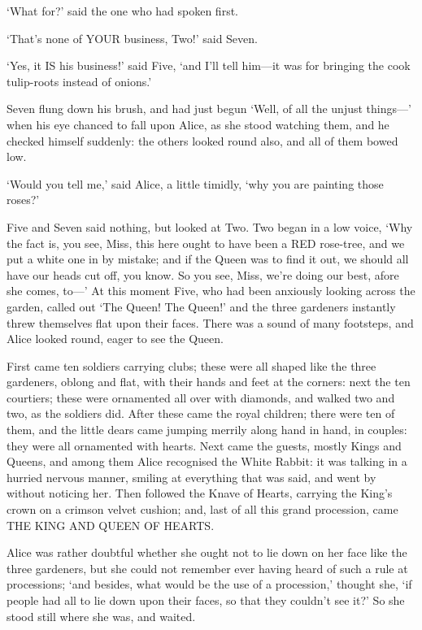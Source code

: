 \documentclass[12pt]{book}
\begin{document}
\begin{Parallel}[p]{}{}
{‘What for?’ said the one who had spoken first.

‘That’s none of YOUR business, Two!’ said Seven.

‘Yes, it IS his business!’ said Five, ‘and I’ll tell him—it was for bringing the cook tulip-roots instead of onions.’

Seven flung down his brush, and had just begun ‘Well, of all the unjust things—’ when his eye chanced to fall upon Alice, as she stood watching them, and he checked himself suddenly: the others looked round also, and all of them bowed low.

‘Would you tell me,’ said Alice, a little timidly, ‘why you are painting those roses?’

Five and Seven said nothing, but looked at Two. Two began in a low voice, ‘Why the fact is, you see, Miss, this here ought to have been a RED rose-tree, and we put a white one in by mistake; and if the Queen was to find it out, we should all have our heads cut off, you know. So you see, Miss, we’re doing our best, afore she comes, to—’ At this moment Five, who had been anxiously looking across the garden, called out ‘The Queen! The Queen!’ and the three gardeners instantly threw themselves flat upon their faces. There was a sound of many footsteps, and Alice looked round, eager to see the Queen.

First came ten soldiers carrying clubs; these were all shaped like the three gardeners, oblong and flat, with their hands and feet at the corners: next the ten courtiers; these were ornamented all over with diamonds, and walked two and two, as the soldiers did. After these came the royal children; there were ten of them, and the little dears came jumping merrily along hand in hand, in couples: they were all ornamented with hearts. Next came the guests, mostly Kings and Queens, and among them Alice recognised the White Rabbit: it was talking in a hurried nervous manner, smiling at everything that was said, and went by without noticing her. Then followed the Knave of Hearts, carrying the King’s crown on a crimson velvet cushion; and, last of all this grand procession, came THE KING AND QUEEN OF HEARTS.

Alice was rather doubtful whether she ought not to lie down on her face like the three gardeners, but she could not remember ever having heard of such a rule at processions; ‘and besides, what would be the use of a procession,’ thought she, ‘if people had all to lie down upon their faces, so that they couldn’t see it?’ So she stood still where she was, and waited.

}
\end{Parallel}
\end{document}
